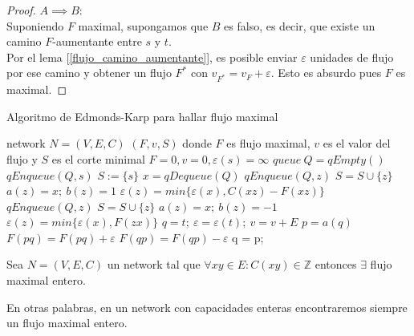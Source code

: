 \begin{proof}
$A \implies B$:\\
Suponiendo $F$ maximal, supongamos que $B$ es falso, es decir, que existe un camino $F$-aumentante entre $s$ y $t$.\\
Por el lema [\ref{flujo_camino_aumentante}], es posible enviar $\varepsilon$ unidades de flujo por ese camino y obtener un flujo $F^*$ con $v_{F^*} = v_F + \varepsilon$. Esto es absurdo pues $F$ es maximal.
\end{proof}

\begin{algorithm}
\caption{Algoritmo de Edmonds-Karp para hallar flujo maximal}
\begin{algorithmic}
\Require network $N=(V,E,C)$
\Ensure  $(F, v, S)$ donde $F$ es flujo maximal, $v$ es el valor del flujo y $S$ es el corte minimal
\State $F = 0, v = 0, \varepsilon(s) = \infty$
    \State $queue\ Q = qEmpty()$
    \State $qEnqueue(Q,s)$
    \State $S := \{s\}$
        \State $x = qDequeue(Q)$
        \State {}
            \State $qEnqueue(Q,z)$
            \State $S = S \cup \{z\}$
            \State $a(z) = x;\ b(z) = 1$
            \State $\varepsilon(z) = min\{\varepsilon(x), C(xz) - F(xz)\}$
        \EndIf
        \EndFor
        \State {}
        \State $qEnqueue(Q,z)$
        \State $S = S \cup \{z\}$
        \State $a(z) = x;\ b(z) = -1$
        \State $\varepsilon(z) = min\{\varepsilon(x), F(zx)\}$
        \EndIf
        \EndFor
        \EndWhile
        \State
        \State $q = t;\ \varepsilon = \varepsilon(t);\ v = v+E$
        \State $p = a(q)$
        \State $F(pq) = F(pq) + \varepsilon$
        \State $F(qp) = F(qp) - \varepsilon$
        \EndIf
        \State q = p;
        \EndWhile
        \Else
        \State {}
        \EndIf
\EndWhile
\EndFunction
\end{algorithmic}
\end{algorithm}

\begin{theorem}\label{integrality}
Sea $N=(V,E,C)$ un network tal que $\forall xy \in E : C(xy) \in \mathbb{Z}$ entonces $\exists$ flujo maximal entero.

En otras palabras, en un network con capacidades enteras encontraremos siempre un flujo maximal entero.
\end{theorem}

